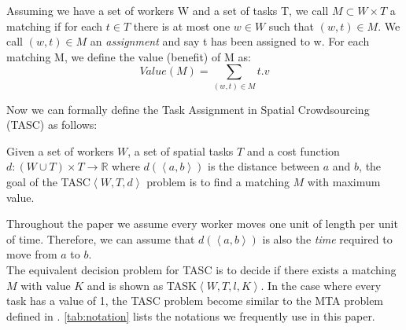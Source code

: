 \begin{definition} [Matching]
Assuming we have a set of workers W and a set of tasks T, we call $M \subset W \times T$ a matching if for each $t \in T$ there is at most one $w \in W$ such that $\left( w, t \right) \in M$. We call $\left( w, t \right) \in M$ an \emph{assignment} and say t has been assigned to w. For each matching M, we define the value (benefit) of M as:
\begin{equation*}
Value(M) = \sum_{\left( w, t \right) \in M} t.v
\end{equation*}
\end{definition}

Now we can formally define the Task Assignment in Spatial Crowdsourcing (TASC) as follows:

\begin{definition}
Given a set of workers $W$, a set of spatial tasks $T$ and a cost function $d: \left( W \cup T \right) \times T \rightarrow \mathbb{R}$ where $d \left( \left\langle a,b \right\rangle \right)$ is the distance between $a$ and $b$, the goal of the TASC$\left\langle W, T, d \right\rangle$ problem is to find a matching $M$ with maximum value.
\end{definition}
Throughout the paper we assume every worker moves one unit of length per unit of time. Therefore, we can assume that $d \left( \left\langle a,b \right\rangle \right)$ is also the \emph{time} required to move from $a$ to $b$.\\

The equivalent decision problem for TASC is to decide if there exists a matching $M$ with value $K$ and is shown as TASK$\left\langle W, T, l, K \right\rangle$. In the case where every task has a value of 1, the TASC problem become similar to the MTA problem defined in \cite{Kazemi12}. \cref{tab:notation} lists the notations we frequently use in this paper.\\

